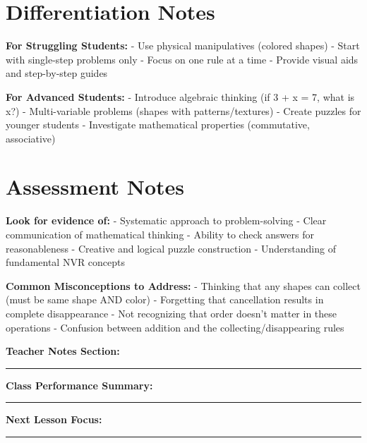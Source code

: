\documentclass{article}
\begin{document}
\section*{Differentiation Notes}

\textbf{For Struggling Students:}
- Use physical manipulatives (colored shapes)
- Start with single-step problems only
- Focus on one rule at a time
- Provide visual aids and step-by-step guides

\textbf{For Advanced Students:}
- Introduce algebraic thinking (if 3 + x = 7, what is x?)
- Multi-variable problems (shapes with patterns/textures)
- Create puzzles for younger students
- Investigate mathematical properties (commutative, associative)

\section*{Assessment Notes}

\textbf{Look for evidence of:}
- Systematic approach to problem-solving
- Clear communication of mathematical thinking  
- Ability to check answers for reasonableness
- Creative and logical puzzle construction
- Understanding of fundamental NVR concepts

\textbf{Common Misconceptions to Address:}
- Thinking that any shapes can collect (must be same shape AND color)
- Forgetting that cancellation results in complete disappearance
- Not recognizing that order doesn't matter in these operations
- Confusion between addition and the collecting/disappearing rules

\vspace{1cm}

\textbf{Teacher Notes Section:}
\hrule
\vspace{3cm}

\textbf{Class Performance Summary:}
\hrule
\vspace{3cm}

\textbf{Next Lesson Focus:}
\hrule
\vspace{2cm}
\end{document}
